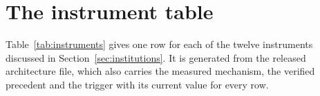 \documentclass[11pt]{article}
\theoremstyle{definition}
\begin{document}
\section{The instrument table}
\label{app:instruments}

Table~\ref{tab:instruments} gives one row for each of the twelve instruments discussed in
Section~\ref{sec:institutions}. It is generated from the released architecture file, which also
carries the measured mechanism, the verified precedent and the trigger with its current value for
every row.

{\small}



\end{document}
